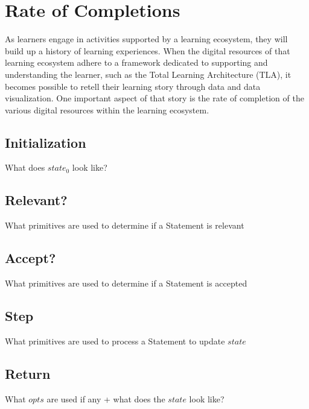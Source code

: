 \documentclass[../main.tex]{subfiles}
\begin{document}
\section{Rate of Completions}
As learners engage in activities supported by a learning ecosystem, they will build
up a history of learning experiences. When the digital resources of that learning ecosystem
adhere to a framework dedicated to supporting and understanding the
learner, such as the Total Learning Architecture (TLA), it becomes
possible to retell their learning story through data and data visualization. One important aspect of
that story is the rate of completion of the various digital resources within the learning ecosystem.

\subsection{Initialization}
What does $state_{0}$ look like?
\subsection{Relevant?}
What primitives are used to determine if a Statement is relevant
\subsection{Accept?}
What primitives are used to determine if a Statement is accepted
\subsection{Step}
What primitives are used to process a Statement to update $state$
\subsection{Return}
What $opts$ are used if any + what does the $state$ look like?
\end{document}
